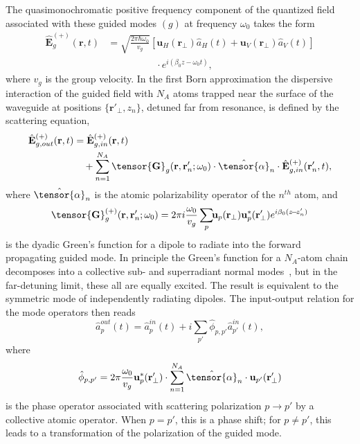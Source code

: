 \documentclass[aps,pra,twocolumn,superscriptaddress]{revtex4-1} %
\def\br{\mathbf{r}}
\newcommand{\nn}{\nonumber}
\newcommand{\mbf}[1]{\mathbf{#1}}
\begin{document}
The quasimonochromatic positive frequency component of the quantized field associated with these guided modes $(g)$ at frequency $\omega_0$ takes the form
\begin{align}\label{eq:Ebp}
\hat{\mathbf{E}}^{(+)}_g(\mbf{r}, t) &= \sqrt{ \frac{2 \pi \hbar \omega_0}{ v_g} } \left[\mathbf{u}_H(\mbf{r}\!_\perp)  \hat{a}_H(t) + \mathbf{u}_V(\mbf{r}\!_\perp) \hat{a}_V(t)\right]\nn\\
&\quad\quad\quad\quad\quad\cdot  e^{i (\beta_0 z- \omega_0 t)},
\end{align}
where $v_g$ is the group velocity.  In the first Born approximation the dispersive interaction of the guided field with $N_A$ atoms trapped near the surface of the waveguide at positions $\{\mbf{r}'_\perp, z_n\}$, detuned far from resonance,  is defined by the scattering equation,
\begin{align}
\hat{\mathbf{E}}^{(+)}_{g,out}(\mbf{r}, t)&=\hat{\mathbf{E}}^{(+)}_{g,in}(\mbf{r}, t)\nn\\
&\quad+\sum_{n=1}^{N_A} \tensor{\mbf{G}}_{g} (\mbf{r}, \mbf{r}'_n;\omega_0) \cdot \hat{\tensor{\alpha}}_n \cdot \hat{\mathbf{E}}^{(+)}_{g,in}(\mbf{r}'_n, t),
\end{align}
where $\hat{\tensor{\alpha}}_n$ is the atomic polarizability operator of the $n^{th}$ atom, and
\begin{equation}
		\tensor{\mathbf{G}}^{(+)}_g(\br,\br'_n; \omega_0) =  2\pi i \frac{\omega_0}{v_g } \sum_{p}\!\! \mathbf{u}_{p} (\br_\perp)\mathbf{u}^*_{p}
(\br_{\perp}^\prime) e^{i \beta_0(z\!-\!z'_n)}  \label{Eq::GreensGuided}
\end{equation}
is the dyadic Green's function for a dipole to radiate into the forward propagating guided mode.  In principle the Green's function for a $N_A$-atom chain decomposes into a collective sub- and superradiant normal modes~\cite{Asenjo-Garcia2017Atom,Asenjo-Garcia2017Exponential}, but in the far-detuning limit, these all are equally excited.  The result is equivalent to the symmetric mode of independently radiating dipoles.  The input-output relation for the mode operators then reads
\begin{equation}
\hat{a}^{out}_p(t) = \hat{a}^{in}_p(t)  +i \sum_{p'} \hat{\phi}_{p,p'} \hat{a}^{in}_{p'}(t) ,
\end{equation}
where
\begin{equation}
\hat{\phi}_{p,p'} = 2\pi \frac{\omega_0}{v_g} \mbf{u}^*_p (\mbf{r}'_\perp) \cdot \sum_{n=1}^{N_A} \hat{\tensor{\alpha}}_n \cdot \mbf{u}_{p'} (\mbf{r}'_\perp)
\end{equation}
is the phase operator associated with scattering polarization $p \rightarrow p'$ by a collective atomic operator.  When $p=p'$, this is a phase shift; for $p \neq p'$, this leads to a transformation of the polarization of the guided mode.
\end{document}
